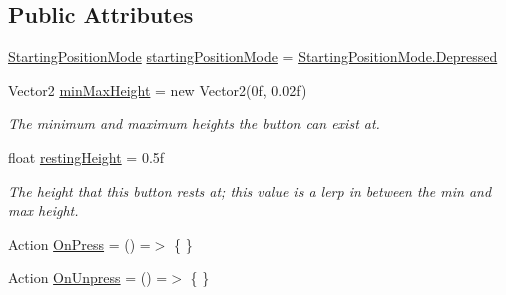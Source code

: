 \subsection*{Public Attributes}
\begin{DoxyCompactItemize}
\item 
\mbox{\hyperlink{class_leap_1_1_unity_1_1_interaction_1_1_interaction_button_a29761e33189cdf8131bb519cdc114fd2}{Starting\+Position\+Mode}} \mbox{\hyperlink{class_leap_1_1_unity_1_1_interaction_1_1_interaction_button_a48c30245b6b71691985f9b4423c8ce59}{starting\+Position\+Mode}} = \mbox{\hyperlink{class_leap_1_1_unity_1_1_interaction_1_1_interaction_button_a29761e33189cdf8131bb519cdc114fd2a83cd8cb2be2d9278f796db9daf0e61eb}{Starting\+Position\+Mode.\+Depressed}}
\item 
Vector2 \mbox{\hyperlink{class_leap_1_1_unity_1_1_interaction_1_1_interaction_button_a26f7eabb9d9880d63ab19f7dbeff186a}{min\+Max\+Height}} = new Vector2(0f, 0.\+02f)
\begin{DoxyCompactList}\small\item\em The minimum and maximum heights the button can exist at. \end{DoxyCompactList}\item 
float \mbox{\hyperlink{class_leap_1_1_unity_1_1_interaction_1_1_interaction_button_ac5d100f680957b8a06989b47241d3624}{resting\+Height}} = 0.\+5f
\begin{DoxyCompactList}\small\item\em The height that this button rests at; this value is a lerp in between the min and max height. \end{DoxyCompactList}\item 
Action \mbox{\hyperlink{class_leap_1_1_unity_1_1_interaction_1_1_interaction_button_a604925418c20993e8dcd62b44442f02e}{On\+Press}} = () =$>$ \{ \}
\item 
Action \mbox{\hyperlink{class_leap_1_1_unity_1_1_interaction_1_1_interaction_button_a20976dd4b5068d794d00f49f894c7139}{On\+Unpress}} = () =$>$ \{ \}
\end{DoxyCompactItemize}
